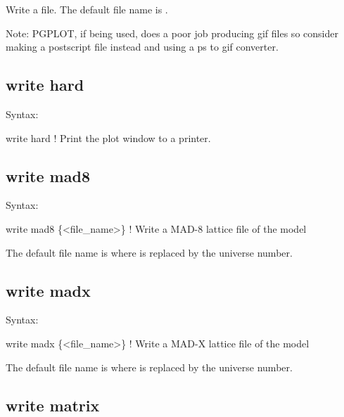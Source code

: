 {{{{{{{{{{{{Write a  file. The default file name is .

Note: PGPLOT, if being used, does a poor job producing gif files so consider making a
postscript file instead and using a ps to gif converter.


\subsection{write hard}
\label{s:write.hard}

Syntax:
\begin{example}
    write hard                        ! Print the plot window to a printer.
\end{example}


\subsection{write mad8}
\label{s:write.mad8}

Syntax:
\begin{example}
    write mad8 \{<file_name>\}  ! Write a MAD-8 lattice file of the model
\end{example}

The default file name is  where \vn{\#} is replaced by the universe number. 


\subsection{write madx}
\label{s:write.madx}

Syntax:
\begin{example}
    write madx \{<file_name>\}  ! Write a MAD-X lattice file of the model
\end{example}

The default file name is  where \vn{\#} is replaced by the universe number. 


\subsection{write matrix}
\label{s:write.mat}

}}}}}}}}}}}}
